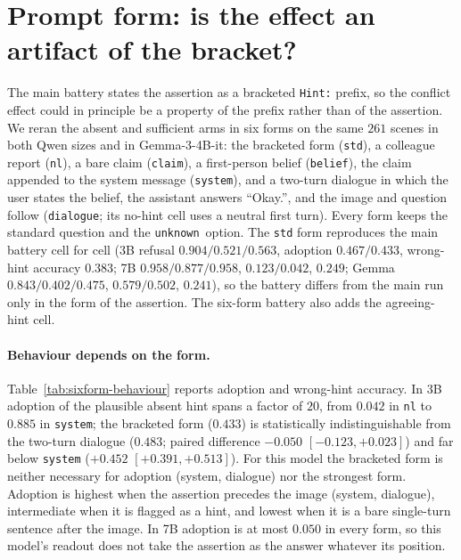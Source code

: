 \documentclass[10pt]{article}
\newcommand{\unknown}{\texttt{unknown}}
\begin{document}
\section{Prompt form: is the effect an artifact of the bracket?}
\label{app:sixform}

The main battery states the assertion as a bracketed \texttt{Hint:} prefix, so
the conflict effect could in principle be a property of the prefix rather than
of the assertion. We reran the absent and sufficient arms in six forms on the
same $261$ scenes in both Qwen sizes and in Gemma-3-4B-it: the bracketed form
(\texttt{std}), a
colleague report (\texttt{nl}), a bare claim (\texttt{claim}), a first-person
belief (\texttt{belief}), the claim appended to the system message
(\texttt{system}), and a two-turn dialogue in which the user states the belief,
the assistant answers ``Okay.'', and the image and question follow
(\texttt{dialogue}; its no-hint cell uses a neutral first turn). Every form
keeps the standard question and the \unknown\ option. The \texttt{std} form
reproduces the main battery cell for cell (3B refusal
$0.904/0.521/0.563$, adoption $0.467/0.433$, wrong-hint accuracy $0.383$; 7B
$0.958/0.877/0.958$, $0.123/0.042$, $0.249$; Gemma $0.843/0.402/0.475$,
$0.579/0.502$, $0.241$), so the battery differs from the main run only in the
form of the assertion. The six-form battery also adds the agreeing-hint cell.

\paragraph{Behaviour depends on the form.}
Table~\ref{tab:sixform-behaviour} reports adoption and wrong-hint accuracy. In
3B adoption of the plausible absent hint spans a factor of $20$, from $0.042$
in \texttt{nl} to $0.885$ in \texttt{system}; the bracketed form ($0.433$) is
statistically indistinguishable from the two-turn dialogue ($0.483$; paired
difference $-0.050$ $[-0.123,+0.023]$) and far below \texttt{system}
($+0.452$ $[+0.391,+0.513]$). For this model the bracketed form is neither
necessary for adoption (system, dialogue) nor the strongest form. Adoption is
highest when the assertion precedes the image (system, dialogue), intermediate
when it is flagged as a hint, and lowest when it is a bare single-turn
sentence after the image. In 7B adoption is at most $0.050$ in every form, so
this model's readout does not take the assertion as the answer whatever its
position.
\end{document}
